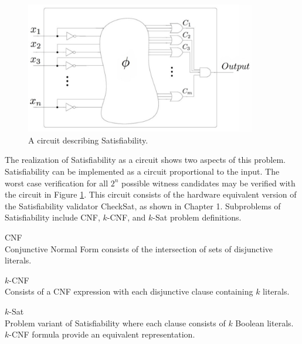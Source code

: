 \begin{figure}[htbp]
\begin{center}

	\includegraphics[width=0.9\textwidth]{figures/circuitLabeled.jpg}

\caption{A circuit describing {\sc Satisfiability}.}
\label{blackBoxSat}
\end{center}
\end{figure}
	
\FloatBarrier

The realization of {\sc Satisfiability} as a circuit shows two aspects of this problem.  {\sc Satisfiability} can be implemented as a circuit proportional to the input.  The worst case verification for all $2^n$ possible witness candidates may be verified with the circuit in Figure \ref{blackBoxSat}.  This circuit consists of the hardware equivalent version of the {\sc Satisfiability} validator {\sc CheckSat}, as shown in Chapter 1.  Subproblems of {\sc Satisfiability} include CNF, $k$-CNF, and $k$-{\sc Sat} problem definitions.

\begin{definition}
CNF\\
Conjunctive Normal Form consists of the intersection of sets of disjunctive literals. 
\end{definition}

\begin{definition}
$k$-CNF\\
Consists of a CNF expression with each disjunctive clause containing $k$ literals.
\end{definition}

\begin{definition}
$k$-{\sc Sat}\\
Problem variant of {\sc Satisfiability} where each clause consists of $k$ Boolean literals.  $k$-CNF formula provide an equivalent representation.
\end{definition}


